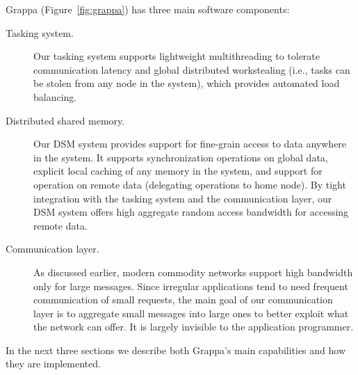 Grappa (Figure~\ref{fig:grappa}) has three main software components:
\begin{description}

\item [Tasking system.] Our tasking system supports lightweight
multithreading to tolerate communication latency and global distributed
workstealing (i.e., tasks can be stolen from any node in the system), which
provides automated load balancing. 

\item[Distributed shared memory.] Our DSM system provides support for
fine-grain access to data anywhere in the system. It supports synchronization
operations on global data, explicit local caching of any memory in the system,
and support for operation on remote data (delegating operations to home node).
By tight integration with the tasking system and the
communication layer, our DSM system offers high aggregate random
access bandwidth for accessing remote data.

\item[Communication layer.] As discussed earlier, modern commodity networks
support high bandwidth only for large messages. Since irregular applications
tend to need frequent communication of small requests, the main goal of our
communication layer is to aggregate small messages into large ones to better
exploit what the network can offer. It is largely invisible to the application
programmer.


\end{description}



In the next three sections we describe both Grappa's main capabilities and how they are implemented.

